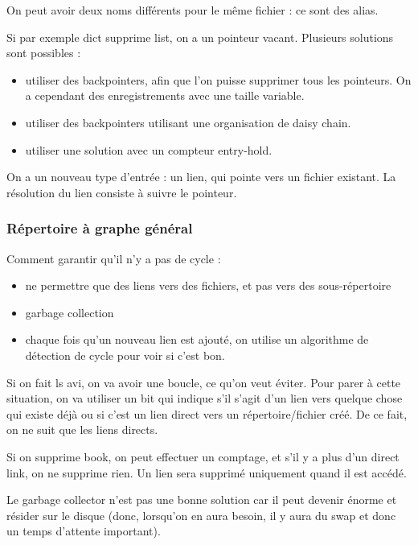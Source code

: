 		
		On peut avoir deux noms différents pour le même fichier : ce sont des alias.
		
		Si par exemple dict supprime list, on a un pointeur vacant. Plusieurs solutions sont possibles :
		
		\begin{itemize}
			\item utiliser des backpointers, afin que l'on puisse supprimer tous les pointeurs. On a cependant des enregistrements avec une taille variable.
			\item utiliser des backpointers utilisant une organisation de daisy chain.
			\item utiliser une solution avec un compteur entry-hold.
		\end{itemize}
		
		On a un nouveau type d'entrée : un lien, qui pointe vers un fichier existant. La résolution du lien consiste à suivre le pointeur.
		
		\subsubsection{Répertoire à graphe général}
		
		
		Comment garantir qu'il n'y a pas de cycle :
		
		\begin{itemize}
			\item ne permettre que des liens vers des fichiers, et pas vers des sous-répertoire
			\item garbage collection
			\item chaque fois qu'un nouveau lien est ajouté, on utilise un algorithme de détection de cycle pour voir si c'est bon.
		\end{itemize}
		
		Si on fait ls avi, on va avoir une boucle, ce qu'on veut éviter. Pour parer à cette situation, on va utiliser un bit qui indique s'il s'agit d'un lien vers quelque chose qui existe déjà ou si c'est un lien direct vers un répertoire/fichier créé. De ce fait, on ne suit que les liens directs.
	
		Si on supprime book, on peut effectuer un comptage, et s'il y a plus d'un direct link, on ne supprime rien. Un lien sera supprimé uniquement quand il est accédé.
		
		Le garbage collector n'est pas une bonne solution car il peut devenir énorme et résider sur le disque (donc, lorsqu'on en aura besoin, il y aura du swap et donc un temps d'attente important).
		
